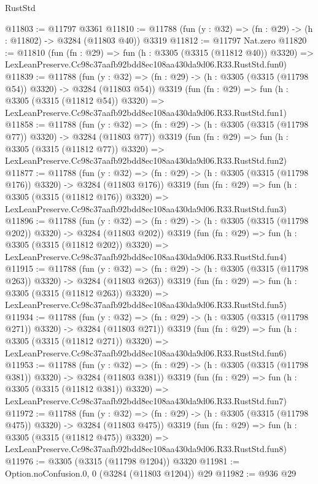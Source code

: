 \begin{lexlean}{RustStd}
\begin{coremodule}
@11803 := @11797 @3361
@11810 := @11788 (fun (y : @32) => (fn : @29) -> (h : @11802) -> @3284 (@11803 @40)) @3319
@11812 := @11797 Nat.zero
@11820 := @11810
    (fun (fn : @29) =>
    fun (h : @3305 (@3315 (@11812 @40)) @3320) =>
    LexLeanPreserve.Cc98c37aafb92bdd8ec108aa430da9d06.R33.RustStd.fun0)
@11839 := @11788
    (fun (y : @32) => (fn : @29) -> (h : @3305 (@3315 (@11798 @54)) @3320) -> @3284 (@11803 @54))
    @3319
    (fun (fn : @29) =>
    fun (h : @3305 (@3315 (@11812 @54)) @3320) =>
    LexLeanPreserve.Cc98c37aafb92bdd8ec108aa430da9d06.R33.RustStd.fun1)
@11858 := @11788
    (fun (y : @32) => (fn : @29) -> (h : @3305 (@3315 (@11798 @77)) @3320) -> @3284 (@11803 @77))
    @3319
    (fun (fn : @29) =>
    fun (h : @3305 (@3315 (@11812 @77)) @3320) =>
    LexLeanPreserve.Cc98c37aafb92bdd8ec108aa430da9d06.R33.RustStd.fun2)
@11877 := @11788
    (fun (y : @32) => (fn : @29) -> (h : @3305 (@3315 (@11798 @176)) @3320) -> @3284 (@11803 @176))
    @3319
    (fun (fn : @29) =>
    fun (h : @3305 (@3315 (@11812 @176)) @3320) =>
    LexLeanPreserve.Cc98c37aafb92bdd8ec108aa430da9d06.R33.RustStd.fun3)
@11896 := @11788
    (fun (y : @32) => (fn : @29) -> (h : @3305 (@3315 (@11798 @202)) @3320) -> @3284 (@11803 @202))
    @3319
    (fun (fn : @29) =>
    fun (h : @3305 (@3315 (@11812 @202)) @3320) =>
    LexLeanPreserve.Cc98c37aafb92bdd8ec108aa430da9d06.R33.RustStd.fun4)
@11915 := @11788
    (fun (y : @32) => (fn : @29) -> (h : @3305 (@3315 (@11798 @263)) @3320) -> @3284 (@11803 @263))
    @3319
    (fun (fn : @29) =>
    fun (h : @3305 (@3315 (@11812 @263)) @3320) =>
    LexLeanPreserve.Cc98c37aafb92bdd8ec108aa430da9d06.R33.RustStd.fun5)
@11934 := @11788
    (fun (y : @32) => (fn : @29) -> (h : @3305 (@3315 (@11798 @271)) @3320) -> @3284 (@11803 @271))
    @3319
    (fun (fn : @29) =>
    fun (h : @3305 (@3315 (@11812 @271)) @3320) =>
    LexLeanPreserve.Cc98c37aafb92bdd8ec108aa430da9d06.R33.RustStd.fun6)
@11953 := @11788
    (fun (y : @32) => (fn : @29) -> (h : @3305 (@3315 (@11798 @381)) @3320) -> @3284 (@11803 @381))
    @3319
    (fun (fn : @29) =>
    fun (h : @3305 (@3315 (@11812 @381)) @3320) =>
    LexLeanPreserve.Cc98c37aafb92bdd8ec108aa430da9d06.R33.RustStd.fun7)
@11972 := @11788
    (fun (y : @32) => (fn : @29) -> (h : @3305 (@3315 (@11798 @475)) @3320) -> @3284 (@11803 @475))
    @3319
    (fun (fn : @29) =>
    fun (h : @3305 (@3315 (@11812 @475)) @3320) =>
    LexLeanPreserve.Cc98c37aafb92bdd8ec108aa430da9d06.R33.RustStd.fun8)
@11976 := @3305 (@3315 (@11798 @1204)) @3320
@11981 := Option.noConfusion.{0, 0} (@3284 (@11803 @1204)) @29
@11982 := @936 @29

\end{coremodule}
\end{lexlean}
